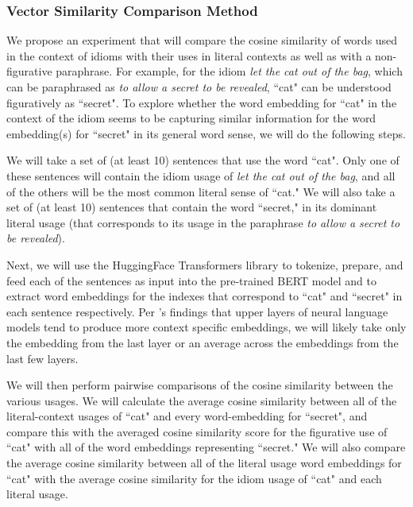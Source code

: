\documentclass[11pt,a4paper]{article}
\begin{document}
 \subsubsection{Vector Similarity Comparison Method}
 
 We propose an experiment that will compare the cosine similarity of words used in the context of idioms with their uses in literal contexts as well as with a non-figurative paraphrase. For example, for the idiom \textit{let the cat out of the bag}, which can be paraphrased as \textit{to allow a secret to be revealed}, ``cat" can be understood figuratively as ``secret". To explore whether the word embedding for ``cat" in the context of the idiom seems to be capturing similar information for the word embedding(s) for ``secret" in its general word sense, we will do the following steps. 
 
 We will take a set of (at least 10) sentences that use the word ``cat".  Only one of these sentences will contain the idiom usage of \textit{let the cat out of the bag}, and all of the others will be the most common literal sense of ``cat." We will also take a set of (at least 10) sentences that contain the word ``secret," in its dominant literal usage (that corresponds to its usage in the paraphrase \textit{to allow a secret to be revealed}). 
 
 Next, we will use the HuggingFace Transformers library \citep{wolf2019huggingfaces} to tokenize, prepare, and feed each of the sentences as input into the pre-trained BERT model and to extract word embeddings for the indexes that correspond to ``cat" and ``secret" in each sentence respectively. Per \citep{ethayarajh2019contextual}'s findings that upper layers of neural language models tend to produce more context specific embeddings, we will likely take only the embedding from the last layer or an average across the embeddings from the last few layers.
 
 We will then perform pairwise comparisons of the cosine similarity between the various usages. We will calculate the average cosine similarity between all of the literal-context usages of ``cat" and every word-embedding for ``secret", and compare this with the averaged cosine similarity score for the figurative use of ``cat" with all of the  word embeddings representing ``secret." We will also compare the average cosine similarity between all of the literal usage word embeddings for ``cat" with the average cosine similarity for the idiom usage of ``cat" and each literal usage.
 
\end{document}
